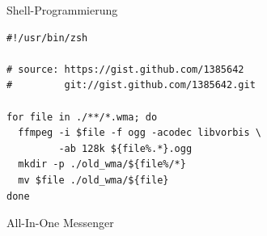 \begin{frame}[fragile]{Shell-Programmierung}
  \lstset{language=bash,
          numbers=left,
          numberstyle=\tiny,
          showstringspaces=false,
          aboveskip=-40pt,
          frame=leftline
  }
  \vspace{2em}
          
  \begin{lstlisting}[caption={Beispiel zur Audio/Video Konvertierung},captionpos=b]
#!/usr/bin/zsh

# source: https://gist.github.com/1385642
#         git://gist.github.com/1385642.git

for file in ./**/*.wma; do
  ffmpeg -i $file -f ogg -acodec libvorbis \
         -ab 128k ${file%.*}.ogg
  mkdir -p ./old_wma/${file%/*}
  mv $file ./old_wma/${file}
done
   \end{lstlisting}
 
\end{frame}


\begin{frame}{All-In-One Messenger}
  \begin{columns}
    \begin{column}{0.5\textwidth}
      
    \end{column}
    \begin{column}{0.5\textwidth}
      
    \end{column}
  \end{columns}
\end{frame}

